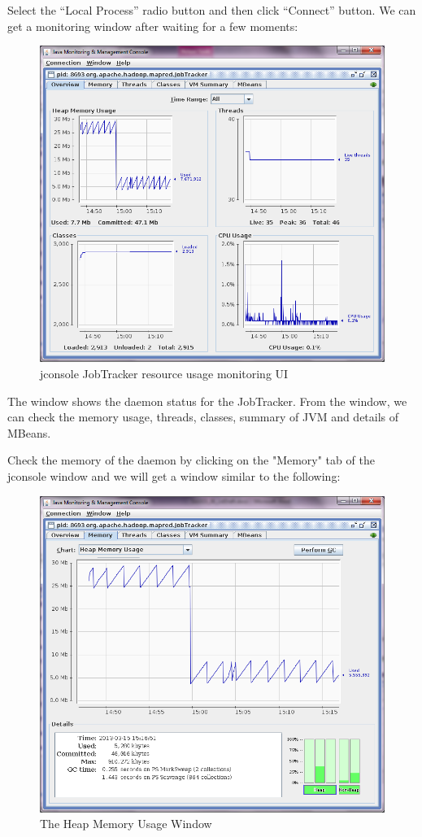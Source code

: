 Select the ``Local Process'' radio button and then click ``Connect'' button. We can get a monitoring window after waiting for a few moments:
\begin{figure}[h]
  \centering
  \includegraphics[width=.8\textwidth]{figs/5163os_06_02.png}
  \caption{jconsole JobTracker resource usage monitoring UI}\label{fig:jconsole.jobtracker}
\end{figure} 

The window shows the daemon status for the JobTracker. From the window, we can check the memory usage, threads, classes, summary of JVM and details of MBeans.

Check the memory of the daemon by clicking on the "Memory" tab of the jconsole window and we will get a window similar to the following: \\
\begin{figure}[h]
  \centering
  \includegraphics[width=.8\textwidth]{figs/5163os_06_03.png}
  \caption{The Heap Memory Usage Window}\label{fig:heap.usage.window}
\end{figure} 

